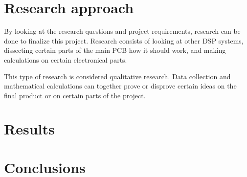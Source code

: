 \section{Research approach}

By looking at the research questions and project requirements, research can be done to finalize this project. Research consists of looking at other DSP systems, dissecting certain parts of the main PCB how it should work, and making calculations on certain electronical parts.  
\par
\noindent This type of research is considered qualitative research. Data collection and mathematical calculations can together prove or disprove certain ideas on the final product or on certain parts of the project.

\section{Results}

\section{Conclusions}

